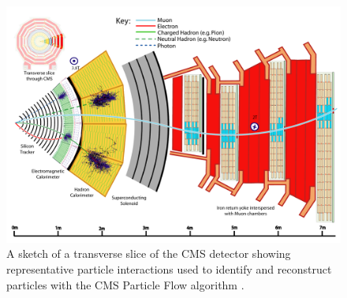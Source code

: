 \begin{figure}
\centering
\includegraphics[width=\textwidth]{figures/lhc_and_cms/cms_slice.pdf}
\caption{A sketch of a transverse slice of the CMS detector showing representative particle interactions used to identify and reconstruct particles with the CMS Particle Flow algorithm \cite{cms_pf}.}
\label{cms_slice}
\end{figure}